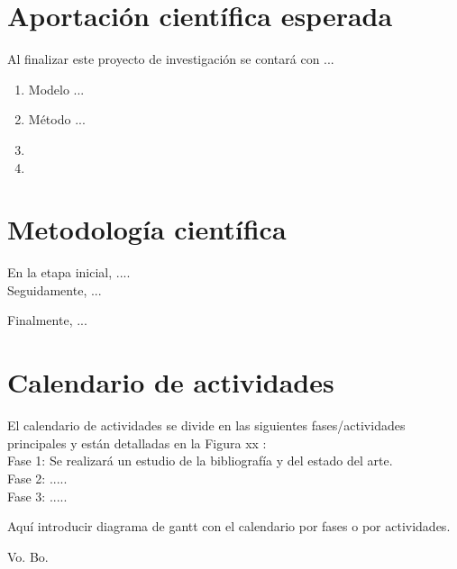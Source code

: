 \documentclass{article}
\begin{document}
\section{Aportación científica esperada}\label{sec:aporte}
Al finalizar este proyecto de investigación se contará con ...
\begin{enumerate}
\item Modelo ...
\item Método ...
\item
\item
\end{enumerate}

\section{Metodología científica}\label{metodologia}
En la etapa inicial, ....\\

Seguidamente, ...


Finalmente, ...


\section{Calendario de actividades}\label{sec:calendario}
El calendario de actividades se divide en las siguientes fases/actividades principales y están detalladas en la Figura xx :\\

Fase 1: Se realizará un estudio de la bibliografía y del estado del arte.\\

Fase 2: .....\\

Fase 3: .....

Aquí introducir diagrama de gantt con el calendario por fases o por actividades.





\clearpage
\vfill
\Large{Vo. Bo.}
\\    \\    \\    \\    \\  \\    \\    \\    \\    \\   
 
\end{document}
